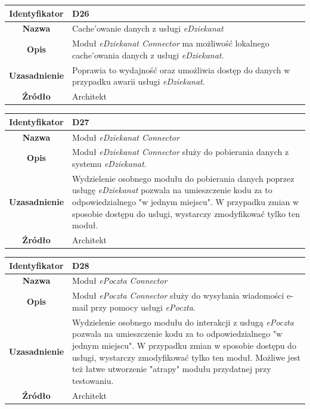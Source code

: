 \begin{table}[H]
\centering
\begin{tabular}{ | >{\bfseries}c | p{11cm} | }
\hline
%
Identyfikator & D26 \\ \hline
Nazwa & Cache'owanie danych z usługi \textit{eDziekanat} \\ \hline
Opis & Moduł \textit{eDziekanat Connector} ma możliwość lokalnego cache'owania danych z usługi \textit{eDziekanat}. \\ \hline
Uzasadnienie & Poprawia to wydajność oraz umożliwia dostęp do danych w przypadku awarii usługi \textit{eDziekanat}. \\ \hline
Źródło & Architekt \\ \hline
%
\end{tabular}
\end{table}

\begin{table}[H]
\centering
\begin{tabular}{ | >{\bfseries}c | p{11cm} | }
\hline
%
Identyfikator & D27 \\ \hline
Nazwa & Moduł \textit{eDziekanat Connector} \\ \hline
Opis & Moduł \textit{eDziekanat Connector} służy do pobierania danych z systemu \textit{eDziekanat}. \\ \hline
Uzasadnienie & Wydzielenie osobnego modułu do pobierania danych poprzez usługę \textit{eDziekanat} pozwala na umieszczenie kodu za to odpowiedzialnego "w jednym miejscu". W przypadku zmian w sposobie dostępu do usługi, wystarczy zmodyfikować tylko ten moduł. \\ \hline
Źródło & Architekt \\ \hline
%
\end{tabular}
\end{table}

\begin{table}[H]
\centering
\begin{tabular}{ | >{\bfseries}c | p{11cm} | }
\hline
%
Identyfikator & D28 \\ \hline
Nazwa & Moduł \textit{ePoczta Connector} \\ \hline
Opis & Moduł \textit{ePoczta Connector} służy do wysyłania wiadomości e-mail przy pomocy usługi \textit{ePoczta}. \\ \hline
Uzasadnienie & Wydzielenie osobnego modułu do interakcji z usługą \textit{ePoczta} pozwala na umieszczenie kodu za to odpowiedzialnego "w jednym miejscu". W przypadku zmian w sposobie dostępu do usługi, wystarczy zmodyfikować tylko ten moduł. Możliwe jest też łatwe utworzenie "atrapy" modułu przydatnej przy testowaniu. \\ \hline
Źródło & Architekt \\ \hline
%
\end{tabular}
\end{table}

